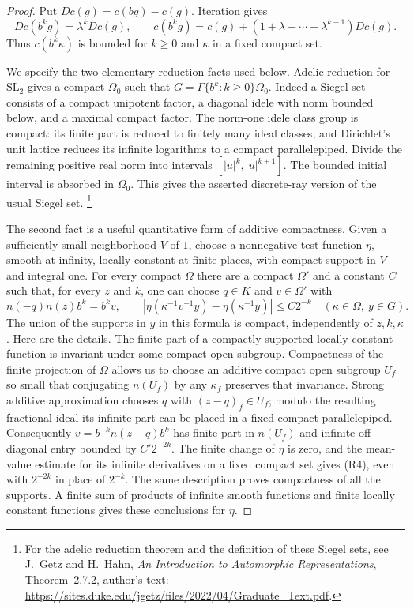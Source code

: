 \begin{proof}
Put \(Dc(g)=c(bg)-c(g)\). Iteration gives
\[
 Dc(b^kg)=\lambda^kDc(g),\qquad
 c(b^kg)=c(g)+(1+\lambda+\cdots+\lambda^{k-1})Dc(g).
 \tag{R3}\label{eq:sr-contraction-geometric}
\]
Thus \(c(b^k\kappa)\) is bounded for \(k\ge0\) and
\(\kappa\) in a fixed compact set.

We specify the two elementary reduction facts used below.
Adelic reduction for \(\mathrm{SL}_2\) gives a compact \(\Omega_0\)
such that \(G=\Gamma\{b^k:k\ge0\}\Omega_0\).
Indeed a Siegel set consists of a compact unipotent factor,
a diagonal idele with norm bounded below, and a maximal compact
factor. The norm-one idele class group is compact: its finite part
is reduced to finitely many ideal classes, and Dirichlet's unit
lattice reduces its infinite logarithms to a compact parallelepiped.
Divide the remaining positive real norm into intervals
\([|u|^k,|u|^{k+1}]\). The bounded initial interval is absorbed
in \(\Omega_0\). This gives the asserted discrete-ray version of
the usual Siegel set.
\footnote{For the adelic reduction theorem and the definition of
these Siegel sets, see J.~Getz and H.~Hahn,
\emph{An Introduction to Automorphic Representations},
Theorem~2.7.2, author's text:
\url{https://sites.duke.edu/jgetz/files/2022/04/Graduate_Text.pdf}.}

The second fact is a useful quantitative form of additive
compactness. Given a sufficiently small neighborhood \(V\) of \(1\),
choose a nonnegative test function \(\eta\), smooth at infinity,
locally constant at finite places, with compact support in \(V\)
and integral one. For every compact \(\Omega\) there are a compact
\(\Omega'\) and a constant \(C\) such that, for every \(z\) and \(k\),
one can choose \(q\in K\) and \(v\in\Omega'\) with
\[
 n(-q)n(z)b^k=b^kv,\qquad
 |\eta(\kappa^{-1}v^{-1}y)-\eta(\kappa^{-1}y)|
           \le C2^{-k}\quad(\kappa\in\Omega,\ y\in G).
 \tag{R4}\label{eq:sr-contraction-bump}
\]
The union of the supports in \(y\) in this formula is compact,
independently of \(z,k,\kappa\).
Here are the details. The finite part of a compactly supported
locally constant function is invariant under some compact open
subgroup. Compactness of the finite projection of \(\Omega\)
allows us to choose an additive compact open subgroup \(U_f\)
so small that conjugating \(n(U_f)\) by any \(\kappa_f\) preserves
that invariance. Strong additive approximation chooses \(q\) with
\((z-q)_f\in U_f\); modulo the resulting fractional ideal its
infinite part can be placed in a fixed compact parallelepiped.
Consequently \(v=b^{-k}n(z-q)b^k\) has finite part in \(n(U_f)\)
and infinite off-diagonal entry bounded by \(C'2^{-2k}\).
The finite change of \(\eta\) is zero, and the mean-value estimate
for its infinite derivatives on a fixed compact set gives (R4),
even with \(2^{-2k}\) in place of \(2^{-k}\).
The same description proves compactness of all the supports.
A finite sum of products of infinite smooth functions and finite
locally constant functions gives these conclusions for \(\eta\).


\end{proof}
